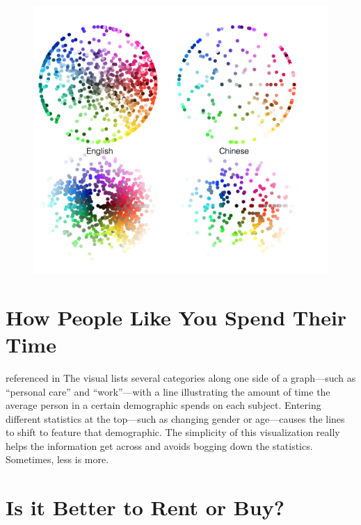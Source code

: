 \documentclass[]{book}
\theoremstyle{definition}
\theoremstyle{definition}
\theoremstyle{definition}
\theoremstyle{remark}
\begin{document}
\begin{figure}
\centering
\includegraphics{images/colorwords.png}
\caption{}
\end{figure}

\section{How People Like You Spend Their
Time}\label{how-people-like-you-spend-their-time}

\citep{spendingtime} referenced in \citep{cool_data} The visual lists
several categories along one side of a graph---such as ``personal care''
and ``work''---with a line illustrating the amount of time the average
person in a certain demographic spends on each subject. Entering
different statistics at the top---such as changing gender or
age---causes the lines to shift to feature that demographic. The
simplicity of this visualization really helps the information get across
and avoids bogging down the statistics. Sometimes, less is more.

\section{Is it Better to Rent or
Buy?}\label{is-it-better-to-rent-or-buy}
\end{document}
